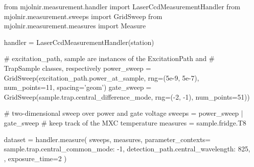 \begin{listing}[htpb]
    \begin{pycode}
        from mjolnir.measurement.handler import LaserCcdMeasurementHandler
        from mjolnir.measurement.sweeps import GridSweep
        from mjolnir.measurement.measures import Measure

        handler = LaserCcdMeasurementHandler(station)

        # excitation_path, sample are instances of the ExcitationPath and
        # TrapSample classes, respectively
        power_sweep = GridSweep(excitation_path.power_at_sample,
                                rng=(5e-9, 5e-7), num_points=11,
                                spacing='geom')
        gate_sweep = GridSweep(sample.trap.central_difference_mode,
                               rng=(-2, -1), num_points=51))

        # two-dimensional sweep over power and gate voltage
        sweeps = power_sweep | gate_sweep
        # keep track of the MXC temperature
        measures = sample.fridge.T8

        dataset = handler.measure(
            sweeps,
            measures,
            parameter_contexts={
                sample.trap.central_common_mode: -1,
                detection_path.central_wavelength: 825,
            },
            exposure_time=2
        )
    \end{pycode}
    \caption[\mjolnir measurement workflow]{
    Setup and measurement workflow using the \mjolnir package.
         is a \qcodes {} object managing the instruments.
        The  object describes a nested loop on whose inner iteration the difference mode parameter of the trap's central gate is swept over a linear grid and on whose outer iteration the laser power, adjusted for the \acrlong{bs} ratio, is swept over a logarithmically spaced grid.
        No dependent parameters ( objects) need to be explicitly specified as the  measures the \gls{ccd} spectrum as well as laser power and leakage currents of the swept gates by default.
        The  argument is used to set the spectrometer wavelength to \qty{825}{\nano\meter} and the common mode voltage of the active trap to \qty{-1}{\volt}.
        The  argument is passed through to the  method, where it is used to set up the \gls{ccd} for acquisition.
    }
    \label{lst:exp:mjolnir:workflow}
\end{listing}

